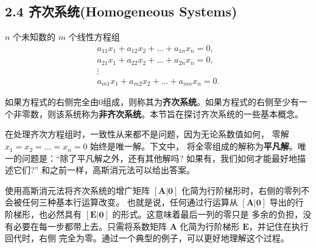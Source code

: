 \subsection{2.4 齐次系统(Homogeneous Systems)}

\(n\) 个未知数的 \(m\) 个线性方程组
\[
\begin{array}{c}
    a_{11}x_1 + a_{12}x_2 + ... + a_{1n}x_n = 0, \\
    a_{21}x_1 + a_{22}x_2 + ... + a_{2n}x_n = 0, \\
    \vdots \\
    a_{m1}x_1 + a_{m2}x_2 + ... + a_{mn}x_n = 0.
\end{array}
\]

如果方程式的右侧完全由0组成，则称其为\textbf{齐次系统}。如果方程式的右侧至少有一个非零数，则该系统称为\textbf{非齐次系统}。本节旨在探讨齐次系统的一些基本概念。

在处理齐次方程组时，一致性从来都不是问题，因为无论系数值如何，
零解 \(x_1 = x_2 = ... = x_n = 0\) 始终是唯一解。下文中，
将全零组成的解称为\textbf{平凡解}。唯一的问题是：“除了平凡解之外，还有其他解吗?
如果有，我们如何才能最好地描述它们?” 和之前一样，高斯消元法可以给出答案。

使用高斯消元法将齐次系统的增广矩阵 \([\mathbf{A|0}]\) 化简为行阶梯形时，右侧的零列不会被任何三种基本行运算改变。
也就是说，任何通过行运算从 \([\mathbf{A|0}]\) 导出的行阶梯形，也必然具有 \([\mathbf{E|0}]\) 的形式。这意味着最后一列的零只是
多余的负担，没有必要在每一步都带上去。只需将系数矩阵 \(\mathbf{A}\) 化简为行阶梯形 \(\mathbf{E}\)，并记住在执行回代时，右侧
完全为零。通过一个典型的例子，可以更好地理解这个过程。

